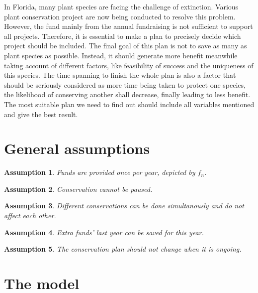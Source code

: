 \documentclass{article}
\newtheorem{assumption}{Assumption}
\begin{document}
In Florida, many plant species are facing the challenge of extinction.
Various plant conservation project are now being conducted to resolve this problem.
However, the fund mainly from the annual fundraising is not sufficient to support all projects.
Therefore, it is essential to make a plan to precisely decide which project should be included.
The final goal of this plan is not to save as many as plant species as possible.
Instead, it should generate more benefit meanwhile taking account of different factors, like feasibility of success and the uniqueness of this species.
The time spanning to finish the whole plan is also a factor that should be seriously considered as more time being taken to protect one species, the likelihood of conserving another shall decrease, finally leading to less benefit.
The most suitable plan we need to find out should include all variables mentioned and give the best result.


\section{General assumptions}

\begin{assumption}
Funds are provided once per year, depicted by $f_n$.
\end{assumption}

\begin{assumption}
	Conservation cannot be paused.
\end{assumption}
\begin{assumption}
	Different conservations can be done simultanously and do not affect each other.
\end{assumption}
\begin{assumption}
	Extra funds' last year can be saved for this year.
\end{assumption}
\begin{assumption}
	The conservation plan should not change when it is ongoing.	
\end{assumption}


\section{The model}
\label{sec:model}
\end{document}
